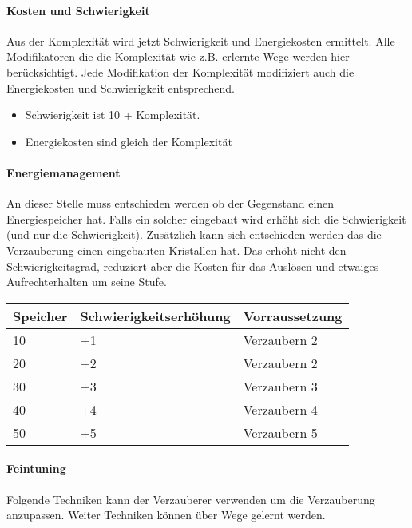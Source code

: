 \documentclass{article}
\begin{document}
\paragraph{Kosten und Schwierigkeit}

Aus der Komplexität wird jetzt Schwierigkeit und Energiekosten ermittelt. Alle Modifikatoren die die Komplexität wie
z.B. erlernte Wege werden hier berücksichtigt. Jede Modifikation der Komplexität modifiziert auch die Energiekosten
und Schwierigkeit entsprechend.

\begin{itemize}
\item Schwierigkeit ist 10 + Komplexität.
\item Energiekosten sind gleich der Komplexität
\end{itemize}

\paragraph{Energiemanagement}

An dieser Stelle muss entschieden werden ob der Gegenstand einen Energiespeicher hat. Falls ein solcher eingebaut
wird erhöht sich die Schwierigkeit (und nur die Schwierigkeit). Zusätzlich kann sich entschieden werden das die
Verzauberung einen eingebauten Kristallen hat. Das erhöht nicht den Schwierigkeitsgrad, reduziert aber die Kosten für
das Auslösen und etwaiges Aufrechterhalten um seine Stufe.


\begin{small}
\begin{tabular}{|m{3cm}|m{4cm}|m{3cm}|}
\hline
\textbf{Speicher}&\textbf{Schwierigkeitserhöhung}&\textbf{Vorraussetzung}\\
\hline
\hline
10&+1&Verzaubern 2\\
\hline
20&+2&Verzaubern 2\\
\hline
30&+3&Verzaubern 3\\
\hline
40&+4&Verzaubern 4\\
\hline
50&+5&Verzaubern 5\\
\hline
\end{tabular}
\end{small}

\paragraph{Feintuning}

Folgende Techniken kann der Verzauberer verwenden um die Verzauberung anzupassen. Weiter Techniken können über Wege
gelernt werden.
\end{document}
